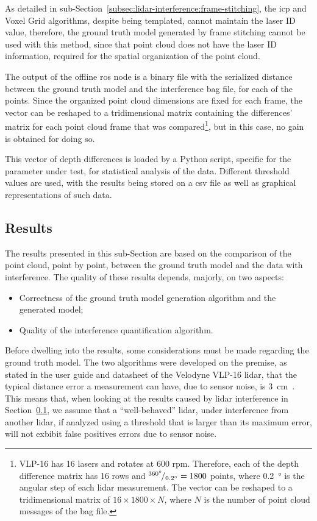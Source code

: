 As detailed in sub-Section~\ref{subsec:lidar-interference:frame-stitching}, the \ac{icp} and Voxel Grid algorithms, despite being templated, cannot maintain the \ac{laser} ID value, therefore, the ground truth model generated by frame stitching cannot be used with this method, since that point cloud does not have the \ac{laser} ID information, required for the spatial organization of the point cloud.

The output of the offline \ac{ros} node is a binary file with the serialized distance between the ground truth model and the interference bag file, for each of the points. Since the organized point cloud dimensions are fixed for each frame, the vector can be reshaped to a tridimensional matrix containing the differences' matrix for each point cloud frame that was compared\footnote{VLP-16 has 16 lasers and rotates at 600 \ac{rpm}. Therefore, each of the depth difference matrix has 16 rows and ${}^{\SI{360}{\degree}}\!/_{\SI{0.2}{\degree}} = 1800$ points, where \SI{0.2}{\degree} is the angular step of each \ac{lidar} measurement. The vector can be reshaped to a tridimensional matrix of $16\times 1800\times N$, where $N$ is the number of point cloud messages of the bag file.}, but in this case, no gain is obtained for doing so.

This vector of depth differences is loaded by a Python script, specific for the parameter under test, for statistical analysis of the data. Different threshold values are used, with the results being stored on a \ac{csv} file as well as graphical representations of such data. 

\subsection{Results}
\label{subsec:lidar-interference:point-to-point-analysis-results}
The results presented in this sub-Section are based on the comparison of the point cloud, point by point, between the ground truth model and the data with interference. The quality of these results depends, majorly, on two aspects:

\begin{itemize}
\item Correctness of the ground truth model generation algorithm and the generated model;
\item Quality of the interference quantification algorithm.
\end{itemize}

Before dwelling into the results, some considerations must be made regarding the ground truth model. The two algorithms were developed on the premise, as stated in the user guide and datasheet of the Velodyne VLP-16 \ac{lidar}, that the typical distance error a measurement can have, due to sensor noise, is \SI{3}{\centi\meter}~\cite{VLP16}. This means that, when looking at the results caused by \ac{lidar} interference in Section~\ref{subsec:lidar-interference:point-to-point-analysis-results}, we assume that a ``well-behaved'' \ac{lidar}, under interference from another \ac{lidar}, if analyzed using a threshold that is larger than its maximum error, will not exbibit false positives errors due to sensor noise.

